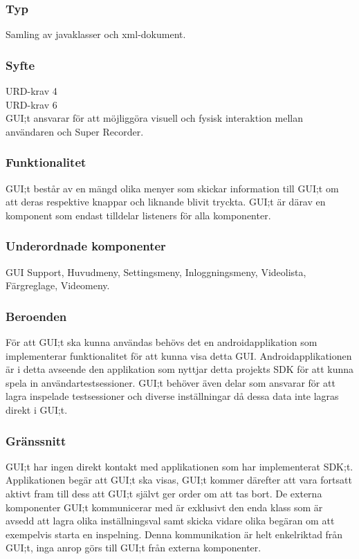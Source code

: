 \subsubsection{Typ}
Samling av javaklasser och xml-dokument.
\subsubsection{Syfte}
URD-krav 4 \\
URD-krav 6  \\
GUI;t ansvarar för att möjliggöra visuell och fysisk interaktion mellan användaren och Super Recorder. 

\subsubsection{Funktionalitet}
GUI;t består av en mängd olika menyer som skickar information till GUI;t om att deras respektive knappar och liknande blivit tryckta. GUI;t är därav en komponent som endast tilldelar listeners för alla komponenter.

\subsubsection{Underordnade komponenter}
GUI Support, Huvudmeny, Settingsmeny, Inloggningsmeny, Videolista, Färgreglage, Videomeny.

\subsubsection{Beroenden}
För att GUI;t ska kunna användas behövs det en androidapplikation som implementerar funktionalitet för att kunna visa detta GUI. Androidapplikationen är i detta avseende den applikation som nyttjar detta projekts SDK för att kunna spela in användartestsessioner. GUI;t behöver även delar som ansvarar för att lagra inspelade testsessioner och diverse inställningar då dessa data inte lagras direkt i GUI;t.

\subsubsection{Gränssnitt}
GUI;t har ingen direkt kontakt med applikationen som har implementerat SDK;t. Applikationen begär att GUI;t ska visas, GUI;t kommer därefter att vara fortsatt aktivt fram till dess att GUI;t självt ger order om att tas bort. De externa komponenter GUI;t kommunicerar med är exklusivt den enda klass som är avsedd att lagra olika inställningsval samt skicka vidare olika begäran om att exempelvis starta en inspelning. Denna kommunikation är helt enkelriktad från GUI;t, inga anrop görs till GUI;t från externa komponenter. 

